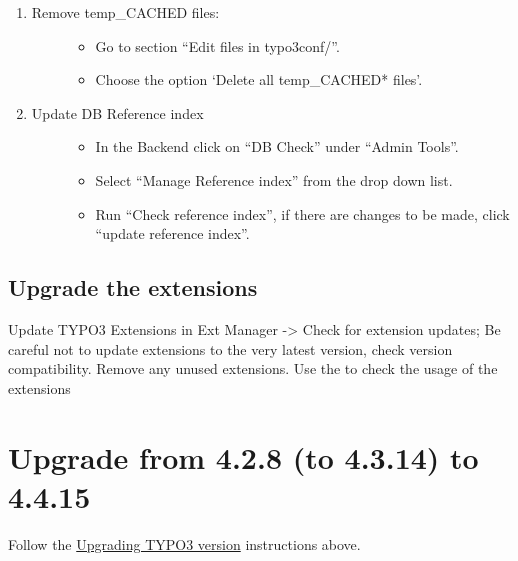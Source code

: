 \documentclass[a4paper,11pt,english]{sphinxmanual}
\begin{document}
\begin{enumerate}
\item {} \begin{description}
\item[{Remove temp\_CACHED files:}] \leavevmode\begin{itemize}
\item {} 
Go to section ``Edit files in typo3conf/''.

\item {} 
Choose the option `Delete all temp\_CACHED* files'.

\end{itemize}

\end{description}

\item {} \begin{description}
\item[{Update DB Reference index}] \leavevmode\begin{itemize}
\item {} 
In the Backend click on ``DB Check'' under ``Admin Tools''.

\item {} 
Select ``Manage Reference index'' from the drop down list.

\item {} 
Run ``Check reference index'', if there are changes to be made, click ``update reference index''.

\end{itemize}

\end{description}

\end{enumerate}


\subsection{Upgrade the extensions}
\label{typo3:upgrade-the-extensions}
Update TYPO3 Extensions in Ext Manager -\textgreater{} Check for extension updates;
Be careful not to update extensions to the very latest version, check
version compatibility. Remove any unused extensions. Use the  to check the usage of the extensions


\section{Upgrade from 4.2.8 (to 4.3.14) to 4.4.15}
\label{typo3:upgrade-from-4-2-8-to-4-3-14-to-4-4-15}
Follow the {\hyperref[typo3:upgrading-typo3-version]{Upgrading TYPO3 version}} instructions above.
\end{document}
